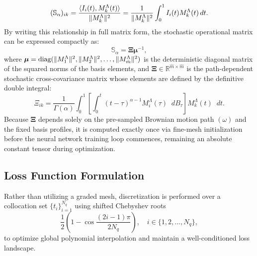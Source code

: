 \documentclass[11pt, a4paper]{article}
\theoremstyle{theoremstyle}
\theoremstyle{definitionstyle}
\newcommand{\dd}{\mathop{}\!d}
\DeclarePairedDelimiter{\norm}{\lVert}{\rVert}
\begin{document}
\begin{equation}\label{eq:25} (\mathbb{S}_\alpha)_{ik} = \frac{\langle I_i(t), M_k^\Lambda(t) \rangle}{\norm{M_k^\Lambda}^2} = \frac{1}{\norm{M_k^\Lambda}^2} \int_0^1 I_i(t) M_k^\Lambda(t) \dd{t}. \end{equation}
By writing this relationship in full matrix form, the stochastic operational matrix can be expressed compactly as:
\begin{equation} \mathbb{S}_\alpha = \mathbf{\Xi} \boldsymbol{\mu}^{-1}, \end{equation}
where \( \boldsymbol{\mu} = \text{diag}(\norm{M_1^\Lambda}^2, \norm{M_2^\Lambda}^2, \dots, \norm{M_{\hat m}^\Lambda}^2) \) is the deterministic diagonal matrix of the squared norms of the basis elements, and \( \mathbf{\Xi} \in \mathbb{R}^{\hat m \times \hat m} \) is the path-dependent stochastic cross-covariance matrix whose elements are defined by the definitive double integral:
\begin{equation} \Xi_{ik} = \frac{1}{\Gamma(\alpha)} \int_0^1 \left[ \int_0^t (t-\tau)^{\alpha-1} M_i^\Lambda(\tau) \dd{B_\tau} \right] M_k^\Lambda(t) \dd{t}. \end{equation}
Because \( \mathbf{\Xi} \) depends solely on the pre-sampled Brownian motion path \( (\omega) \) and the fixed basis profiles, it is computed exactly once via fine-mesh initialization before the neural network training loop commences, remaining an absolute constant tensor during optimization.

\subsection{Loss Function Formulation}\label{sec:loss_form}
Rather than utilizing a graded mesh, discretization is performed over a collocation set $\{t_i\}_{i=1}^{N_q}$ using shifted Chebyshev roots
\begin{equation}
    \frac{1}{2}\left (1 - \cos \frac{(2i-1)\pi}{2N_q}\right ), \quad i \in \{1, 2, \dots , N_q\}, 
\end{equation}
to optimize global polynomial interpolation and maintain a well-conditioned loss landscape.
\end{document}
